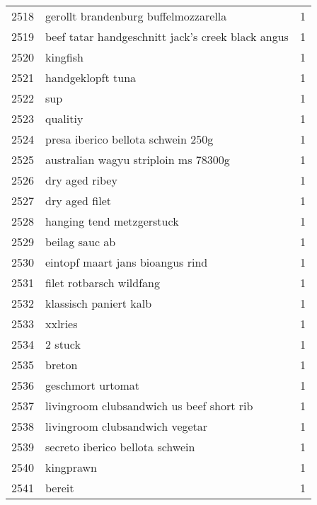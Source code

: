 \begin{tabular}{llr}
2518 &               gerollt brandenburg buffelmozzarella &      1 \\
2519 &  beef tatar handgeschnitt jack’s creek black angus &      1 \\
2520 &                                           kingfish &      1 \\
2521 &                                  handgeklopft tuna &      1 \\
2522 &                                                sup &      1 \\
2523 &                                           qualitiy &      1 \\
2524 &                 presa iberico bellota schwein 250g &      1 \\
2525 &               australian wagyu striploin ms 78300g &      1 \\
2526 &                                     dry aged ribey &      1 \\
2527 &                                     dry aged filet &      1 \\
2528 &                          hanging tend metzgerstuck &      1 \\
2529 &                                     beilag sauc ab &      1 \\
2530 &                   eintopf maart jans bioangus rind &      1 \\
2531 &                           filet rotbarsch wildfang &      1 \\
2532 &                             klassisch paniert kalb &      1 \\
2533 &                                            xxlries &      1 \\
2534 &                                            2 stuck &      1 \\
2535 &                                             breton &      1 \\
2536 &                                  geschmort urtomat &      1 \\
2537 &          livingroom clubsandwich us beef short rib &      1 \\
2538 &                    livingroom clubsandwich vegetar &      1 \\
2539 &                    secreto iberico bellota schwein &      1 \\
2540 &                                          kingprawn &      1 \\
2541 &                                             bereit &      1 \\

\end{tabular}
